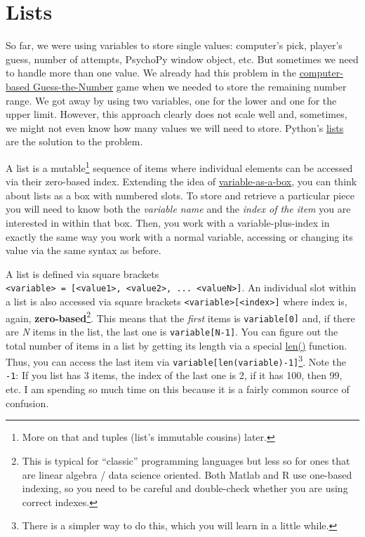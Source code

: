 \documentclass[
]{book}
\begin{document}
\hypertarget{lists}{%
\section{Lists}\label{lists}}

So far, we were using variables to store single values: computer's pick, player's guess, number of attempts, PsychoPy window object, etc. But sometimes we need to handle more than one value. We already had this problem in the \protect\hyperlink{guess-the-number-ai}{computer-based Guess-the-Number} game when we needed to store the remaining number range. We got away by using two variables, one for the lower and one for the upper limit. However, this approach clearly does not scale well and, sometimes, we might not even know how many values we will need to store. Python's \href{https://docs.python.org/3/library/stdtypes.html\#lists}{lists} are the solution to the problem.

A list is a mutable\footnote{More on that and tuples (list's immutable cousins) later.} sequence of items where individual elements can be accessed via their zero-based index. Extending the idea of \protect\hyperlink{variables}{variable-as-a-box}, you can think about lists as a box with numbered slots. To store and retrieve a particular piece you will need to know both the \emph{variable name} and the \emph{index of the item} you are interested in within that box. Then, you work with a variable-plus-index in exactly the same way you work with a normal variable, accessing or changing its value via the same syntax as before.

A list is defined via square brackets \texttt{\textless{}variable\textgreater{}\ =\ {[}\textless{}value1\textgreater{},\ \textless{}value2\textgreater{},\ ...\ \textless{}valueN\textgreater{}{]}}. An individual slot within a list is also accessed via square brackets \texttt{\textless{}variable\textgreater{}{[}\textless{}index\textgreater{}{]}} where index is, again, \textbf{zero-based}\footnote{This is typical for ``classic'' programming languages but less so for ones that are linear algebra / data science oriented. Both Matlab and R use one-based indexing, so you need to be careful and double-check whether you are using correct indexes.}. This means that the \emph{first} items is \texttt{variable{[}0{]}} and, if there are \emph{N} items in the list, the last one is \texttt{variable{[}N-1{]}}. You can figure out the total number of items in a list by getting its length via a special \href{https://docs.python.org/3/library/functions.html\#len}{len()} function. Thus, you can access the last item via \texttt{variable{[}len(variable)-1{]}}\footnote{There is a simpler way to do this, which you will learn in a little while.}. Note the \texttt{-1}: If you list has 3 items, the index of the last one is 2, if it has 100, then 99, etc. I am spending so much time on this because it is a fairly common source of confusion.
\end{document}
